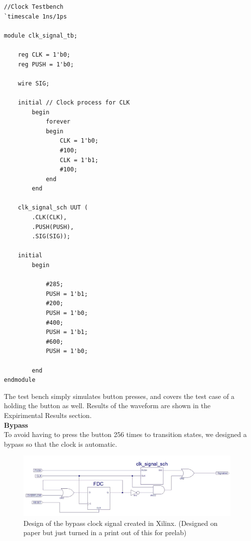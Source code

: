 \documentclass[12pt]{article}
\begin{document}
		
		\begin{Verbatim}[frame=single, fontsize= \small]
//Clock Testbench
`timescale 1ns/1ps

module clk_signal_tb;

	reg CLK = 1'b0;
	reg PUSH = 1'b0;

	wire SIG;

	initial // Clock process for CLK
		begin
			forever
			begin
				CLK = 1'b0;
				#100; 
				CLK = 1'b1;
				#100;
			end
		end
	
	clk_signal_sch UUT (
		.CLK(CLK),
		.PUSH(PUSH),
		.SIG(SIG));

	initial 
		begin

			#285;
			PUSH = 1'b1;
			#200;
			PUSH = 1'b0;
			#400;
			PUSH = 1'b1;
			#600;
			PUSH = 1'b0;

		end
endmodule

		\end{Verbatim}
		The test bench simply simulates button presses, and covers the test case of a holding the button as well. Results of the waveform are shown in the Expirimental Results section.\\\newline\textbf{Bypass}\\
		To avoid having to press the button 256 times to transition states, we designed a bypass so that the clock is automatic. 
		 \begin{figure}[h]
		 	\includegraphics[scale=.45]{BypassClk.PNG}
		 	\caption{Design of the bypass clock signal created in Xilinx. (Designed on paper but just turned in a print out of this for prelab)}
		 \end{figure}
\end{document}
